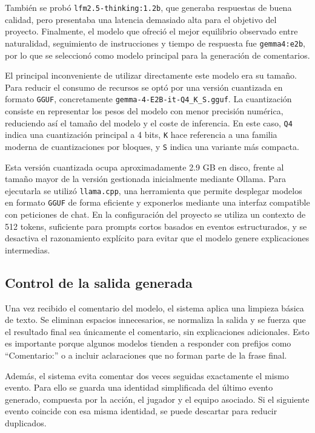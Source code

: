 También se probó \texttt{lfm2.5-thinking:1.2b}, que generaba respuestas de buena calidad, pero presentaba una latencia demasiado alta para el objetivo del proyecto. Finalmente, el modelo que ofreció el mejor equilibrio observado entre naturalidad, seguimiento de instrucciones y tiempo de respuesta fue \texttt{gemma4:e2b}, por lo que se seleccionó como modelo principal para la generación de comentarios.

El principal inconveniente de utilizar directamente este modelo era su tamaño. Para reducir el consumo de recursos se optó por una versión cuantizada en formato \texttt{GGUF}, concretamente \texttt{gemma-4-E2B-it-Q4\_K\_S.gguf}. La cuantización consiste en representar los pesos del modelo con menor precisión numérica, reduciendo así el tamaño del modelo y el coste de inferencia. En este caso, \texttt{Q4} indica una cuantización principal a 4 bits, \texttt{K} hace referencia a una familia moderna de cuantizaciones por bloques, y \texttt{S} indica una variante más compacta.

Esta versión cuantizada ocupa aproximadamente 2.9 GB en disco, frente al tamaño mayor de la versión gestionada inicialmente mediante Ollama. Para ejecutarla se utilizó \texttt{llama.cpp}, una herramienta que permite desplegar modelos en formato \texttt{GGUF} de forma eficiente y exponerlos mediante una interfaz compatible con peticiones de chat. En la configuración del proyecto se utiliza un contexto de 512 tokens, suficiente para prompts cortos basados en eventos estructurados, y se desactiva el razonamiento explícito para evitar que el modelo genere explicaciones intermedias.

\subsection{Control de la salida generada}

Una vez recibido el comentario del modelo, el sistema aplica una limpieza básica de texto. Se eliminan espacios innecesarios, se normaliza la salida y se fuerza que el resultado final sea únicamente el comentario, sin explicaciones adicionales. Esto es importante porque algunos modelos tienden a responder con prefijos como ``Comentario:'' o a incluir aclaraciones que no forman parte de la frase final.

Además, el sistema evita comentar dos veces seguidas exactamente el mismo evento. Para ello se guarda una identidad simplificada del último evento generado, compuesta por la acción, el jugador y el equipo asociado. Si el siguiente evento coincide con esa misma identidad, se puede descartar para reducir duplicados.

